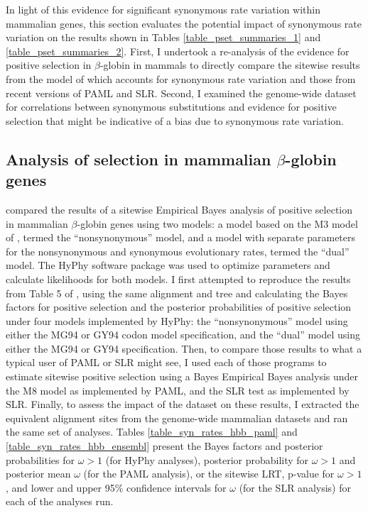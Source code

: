 In light of this evidence for significant synonymous rate variation
within mammalian genes, this section evaluates the potential impact of
synonymous rate variation on the results shown in Tables
\ref{table_pset_summaries_1} and \ref{table_pset_summaries_2}. First,
I undertook a re-analysis of the evidence for positive selection in
$\beta$-globin in mammals to directly compare the sitewise results
from the model of \citet{Pond2005b} which accounts for synonymous rate
variation and those from recent versions of PAML and SLR. Second, I
examined the genome-wide dataset for correlations between synonymous
substitutions and evidence for positive selection that might be
indicative of a bias due to synonymous rate variation.

\subsection{Analysis of selection in mammalian $\beta$-globin genes}

\citet{Pond2005b} compared the results of a sitewise Empirical Bayes
analysis of positive selection in mammalian $\beta$-globin genes using
two models: a model based on the M3 model of \citet{TODO}, termed the
``nonsynonymous'' model, and a model with separate parameters for the
nonsynonymous and synonymous evolutionary rates, termed the ``dual''
model. The HyPhy software package \citep{TODO} was used to optimize
parameters and calculate likelihoods for both models. I first
attempted to reproduce the results from Table 5 of \citet{Pond2005b},
using the same alignment and tree and calculating the Bayes factors
for positive selection and the posterior probabilities of positive
selection under four models implemented by HyPhy: the
``nonsynonymous'' model using either the MG94 or GY94 codon model
specification, and the ``dual'' model using either the MG94 or GY94
specification. Then, to compare those results to what a typical user
of PAML or SLR might see, I used each of those programs to estimate
sitewise positive selection using a Bayes Empirical Bayes analysis
under the M8 model as implemented by PAML, and the SLR test as
implemented by SLR. Finally, to assess the impact of the dataset on
these results, I extracted the equivalent alignment sites from the
genome-wide mammalian datasets and ran the same set of
analyses. Tables \ref{table_syn_rates_hbb_paml} and
\ref{table_syn_rates_hbb_ensembl} present the Bayes factors and
posterior probabilities for $\omega>1$ (for HyPhy analyses), posterior
probability for $\omega>1$ and posterior mean $\omega$ (for the PAML
analysis), or the sitewise LRT, p-value for $\omega>1$, and lower and
upper 95\% confidence intervals for $\omega$ (for the SLR analysis)
for each of the analyses run.

